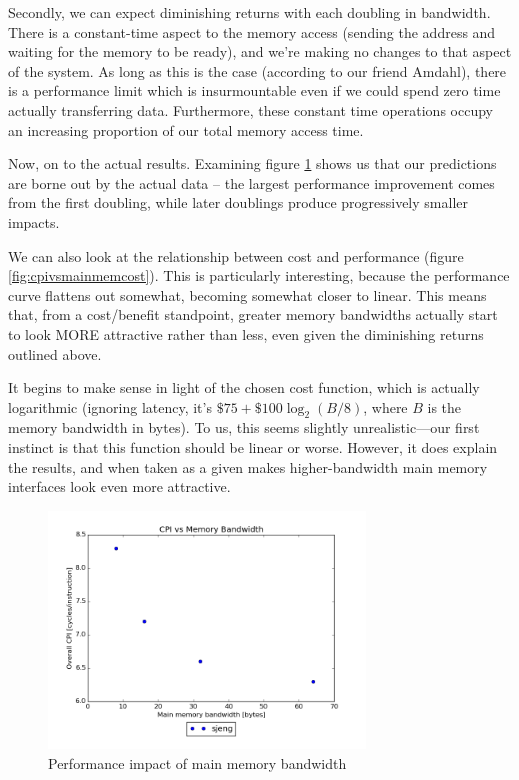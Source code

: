 \documentclass{article}
\begin{document}
Secondly, we can expect diminishing returns with each doubling in bandwidth.
There is a constant-time aspect to the memory access (sending the address and
waiting for the memory to be ready), and we're making no changes to that aspect
of the system. As long as this is the case (according to our friend Amdahl),
there is a performance limit which is insurmountable even if we could spend zero
time actually transferring data. Furthermore, these constant time operations
occupy an increasing proportion of our total memory access time.

Now, on to the actual results. Examining figure \ref{fig:cpivsband} shows us
that our predictions are borne out by the actual data -- the largest performance
improvement comes from the first doubling, while later doublings produce
progressively smaller impacts.

We can also look at the relationship between cost and performance (figure
\ref{fig:cpivsmainmemcost}). This is particularly interesting, because the
performance curve flattens out somewhat, becoming somewhat closer to linear.
This means that, from a cost/benefit standpoint, greater memory bandwidths
actually start to look MORE attractive rather than less, even given the
diminishing returns outlined above.

It begins to make sense in light of the chosen cost function, which is actually
logarithmic (ignoring latency, it's $\$75 + \$100 \log_2(B / 8)$, where $B$ is
the memory bandwidth in bytes). To us, this seems slightly unrealistic---our
first instinct is that this function should be linear or worse. However, it does
explain the results, and when taken as a given makes higher-bandwidth main
memory interfaces look even more attractive.

\begin{figure}[ht]
    \centering
    \includegraphics[width=0.75\textwidth]{plots/CPI_vs_Bandwidth.png}
    \caption{Performance impact of main memory bandwidth}
    \label{fig:cpivsband}
\end{figure}
\end{document}
